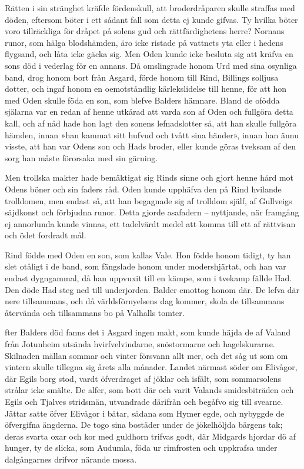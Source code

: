 Rätten i sin stränghet kräfde fördenskull, att broderdråparen skulle
straffas med döden, eftersom böter i ett sådant fall som detta ej kunde
gifvas. Ty hvilka böter voro tillräckliga för dråpet på solens gud och
rättfärdighetens herre? Nornans runor, som hälga blodshämden, äro icke
ristade på vattnets yta eller i hedens flygsand, och låta icke gäcka
sig. Men Oden kunde icke besluta sig att kräfva en sons död i vederlag
för en annans. Då omslingrade honom Urd med sina osynliga band, drog
honom bort från Asgard, förde honom till Rind, Billings solljusa dotter,
och ingaf honom en oemotståndlig kärlekslidelse till henne, för att hon
med Oden skulle föda en son, som blefve Balders hämnare. Bland de ofödda
själarna var en redan af henne utkårad att varda son af Oden och
fullgöra detta kall, och af nåd hade hon lagt den sonens lefnadslotter
så, att han skulle fullgöra hämden, innan »han kammat sitt hufvud och
tvått sina händer», innan han ännu visste, att han var Odens son och
Hads broder, eller kunde göras tveksam af den sorg han måste förorsaka
med sin gärning.

Men trollska makter hade bemäktigat sig Rinds sinne och gjort henne hård
mot Odens böner och sin faders råd. Oden kunde upphäfva den på Rind
hvilande trolldomen, men endast så, att han begagnade sig af trolldom
själf, af Gullveigs säjdkonst och förbjudna runor. Detta gjorde
asafadern -- nyttjande, när framgång ej annorlunda kunde vinnas, ett
tadelvärdt medel att komma till ett af rättvisan och ödet fordradt mål.

Rind födde med Oden en son, som kallas Vale. Hon födde honom tidigt, ty
han slet otåligt i de band, som fängslade honom under modershjärtat, och
han var endast dygngammal, då han uppvuxit till en kämpe, som i tvekamp
fällde Had. Den döde Had steg ned till underjorden. Balder emottog honom
där. De lefva där nere tillsammans, och då världsförnyelsens dag kommer,
skola de tillsammans återvända och tillsammans bo på Valhalls tomter.

\endSecII


\dropcapE fter Balders död fanns det i Asgard ingen makt, som kunde häjda de af
Valand från Jotunheim utsända hvirfvelvindarne, snöstormarne och
hagelskurarne. Skilnaden mällan sommar och vinter försvann allt mer, och
det såg ut som om vintern skulle tillegna sig årets alla månader. Landet
närmast söder om Elivågor, där Egils borg stod, vardt öfverdraget af
jöklar och isfält, som sommarsolens strålar icke smälte. De alfer, som
bott där och varit Valands smidesbiträden och Egils och Tjalves
stridsmän, utvandrade därifrån och begåfvo sig till svearne. Jättar
satte öfver Elivågor i båtar, sådana som Hymer egde, och nybyggde de
öfvergifna ängderna. De togo sina bostäder under de jökelhöljda bärgens
tak; deras svarta oxar och kor med guldhorn trifvas godt, där Midgards
hjordar dö af hunger, ty de slicka, som Audumla, föda ur rimfrosten och
uppkrafsa under dalgångarnes drifvor närande mossa.

